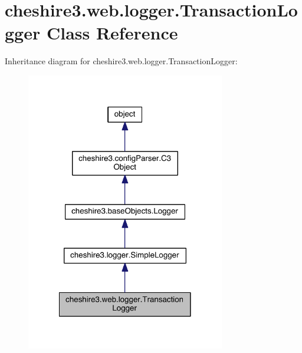 \hypertarget{classcheshire3_1_1web_1_1logger_1_1_transaction_logger}{\section{cheshire3.\-web.\-logger.\-Transaction\-Logger Class Reference}
\label{classcheshire3_1_1web_1_1logger_1_1_transaction_logger}
}


Inheritance diagram for cheshire3.\-web.\-logger.\-Transaction\-Logger\-:
\nopagebreak
\begin{figure}[H]
\begin{center}
\leavevmode
\includegraphics[width=246pt]{classcheshire3_1_1web_1_1logger_1_1_transaction_logger__inherit__graph}
\end{center}
\end{figure}


